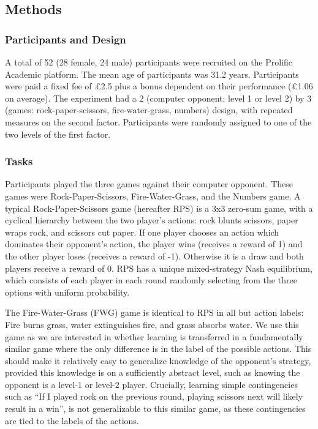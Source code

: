 \documentclass[smallextended]{svjour3}       %
\begin{document}
\hypertarget{methods}{%
\subsection{Methods}\label{methods}}

\hypertarget{participants-and-design}{%
\subsubsection{Participants and Design}\label{participants-and-design}}

A total of 52 (28 female, 24 male) participants were recruited on the
Prolific Academic platform. The mean age of participants was 31.2 years.
Participants were paid a fixed fee of £2.5 plus a bonus dependent on
their performance (£1.06 on average). The experiment had a 2 (computer
opponent: level 1 or level 2) by 3 (games: rock-paper-scissors,
fire-water-grass, numbers) design, with repeated measures on the second
factor. Participants were randomly assigned to one of the two levels of
the first factor.

\hypertarget{tasks}{%
\subsubsection{Tasks}\label{tasks}}

Participants played the three games against their computer opponent.
These games were Rock-Paper-Scissors, Fire-Water-Grass, and the Numbers
game. A typical Rock-Paper-Scissors game (hereafter RPS) is a 3x3
zero-sum game, with a cyclical hierarchy between the two player's
actions: rock blunts scissors, paper wraps rock, and scissors cut paper.
If one player chooses an action which dominates their opponent's action,
the player wins (receives a reward of 1) and the other player loses
(receives a reward of -1). Otherwise it is a draw and both players
receive a reward of 0. RPS has a unique mixed-strategy Nash equilibrium,
which consists of each player in each round randomly selecting from the
three options with uniform probability.

The Fire-Water-Grass (FWG) game is identical to RPS in all but action
labels: Fire burns grass, water extinguishes fire, and grass absorbs
water. We use this game as we are interested in whether learning is
transferred in a fundamentally similar game where the only difference is
in the label of the possible actions. This should make it relatively
easy to generalize knowledge of the opponent's strategy, provided this
knowledge is on a sufficiently abstract level, such as knowing the
opponent is a level-1 or level-2 player. Crucially, learning simple
contingencies such as ``If I played rock on the previous round, playing
scissors next will likely result in a win'', is not generalizable to
this similar game, as these contingencies are tied to the labels of the
actions.
\end{document}
